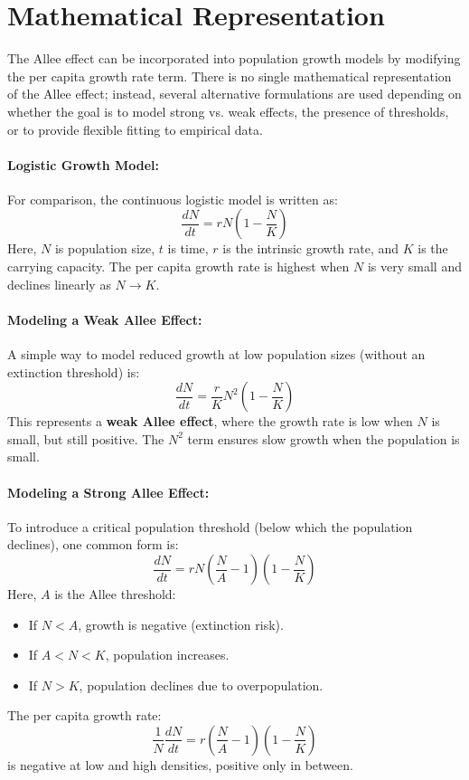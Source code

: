 \documentclass{article}
\begin{document}
\section{Mathematical Representation}

The Allee effect can be incorporated into population growth models by modifying the per capita growth rate term. There is no single mathematical representation of the Allee effect; instead, several alternative formulations are used depending on whether the goal is to model strong vs. weak effects, the presence of thresholds, or to provide flexible fitting to empirical data.

\paragraph{Logistic Growth Model:}
For comparison, the continuous logistic model is written as:
\[
\frac{dN}{dt} = rN\left(1 - \frac{N}{K}\right)
\]
Here, $N$ is population size, $t$ is time, $r$ is the intrinsic growth rate, and $K$ is the carrying capacity. The per capita growth rate is highest when $N$ is very small and declines linearly as $N \to K$.

\paragraph{Modeling a Weak Allee Effect:}
A simple way to model reduced growth at low population sizes (without an extinction threshold) is:
\[
\frac{dN}{dt} = \frac{r}{K}N^2\left(1 - \frac{N}{K} \right)
\]
This represents a \textbf{weak Allee effect}, where the growth rate is low when $N$ is small, but still positive. The $N^2$ term ensures slow growth when the population is small.

\paragraph{Modeling a Strong Allee Effect:}
To introduce a critical population threshold (below which the population declines), one common form is:
\[
\frac{dN}{dt} = rN\left(\frac{N}{A} - 1\right)\left(1 - \frac{N}{K}\right)
\]
Here, $A$ is the Allee threshold:
\begin{itemize}
    \item If $N < A$, growth is negative (extinction risk).
    \item If $A < N < K$, population increases.
    \item If $N > K$, population declines due to overpopulation.
\end{itemize}
The per capita growth rate:
\[
\frac{1}{N}\frac{dN}{dt} = r\left(\frac{N}{A} - 1\right)\left(1 - \frac{N}{K}\right)
\]
is negative at low and high densities, positive only in between.
\end{document}
